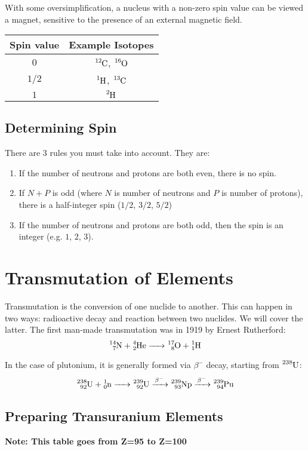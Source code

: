 \documentclass{article}
\begin{document}
\begin{multicols*}{2}
    With some oversimplification, a nucleus with a non-zero spin value
    can be viewed a magnet, sensitive to the presence of an external magnetic
    field.\\

    \begin{tabular}{|c|c|}
      \hline
      Spin value & Example Isotopes \\
      \hline
      $0$ & $\ce{^{12}C}$, $\ce{^{16}O}$ \\
      $1/2$ & $\ce{^{1}H}$, $\ce{^{13}C}$ \\
      $1$ & $\ce{^{2}H}$ \\
      \hline
    \end{tabular}

    \subsection{Determining Spin}
    There are $3$ rules you must take into account. They are:
    \begin{enumerate}
      \item If the number of neutrons and protons are both even, there is no spin.
      \item If $N+P$ is odd (where $N$ is number of neutrons and $P$ is number of protons),
      there is a half-integer spin ($1/2$, $3/2$, $5/2$)
      \item If the number of neutrons and protons are both odd, then the spin is an integer
      (e.g. $1$, $2$, $3$).
    \end{enumerate}

    \section{Transmutation of Elements}
    Transmutation is the conversion of one nuclide to another. This can happen in two ways:
    radioactive decay and reaction between two nuclides. We will cover the latter. The first
    man-made transmutation was in 1919 by Ernest Rutherford:
    \[
      \ce{^{14}_7N + ^4_2{He} -> ^{17}_8O + ^1_1H}
    \]

    In the case of plutonium, it is generally formed via $\beta^{-}$ decay,
    starting from $\ce{^{238}U}$:
    \[
      \ce{^{238}_{92}U + ^1_0n -> ^{239}_{92}U ->[\beta^{-}] ^{239}_{93}Np ->[\beta^{-}] ^{239}_{94}Pu}
    \]

    \subsection{Preparing Transuranium Elements}
    \textbf{Note: This table goes from Z=95 to Z=100}\\


\end{multicols*}
\end{document}
